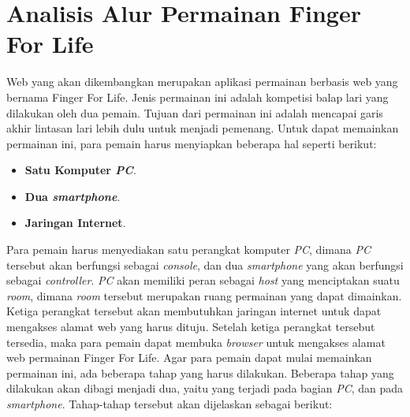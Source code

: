\section{Analisis Alur Permainan Finger For Life}
\label{alur}

Web yang akan dikembangkan merupakan aplikasi permainan berbasis web yang bernama Finger For Life. Jenis permainan ini adalah kompetisi balap lari yang dilakukan oleh dua pemain. Tujuan dari permainan ini adalah mencapai garis akhir lintasan lari lebih dulu untuk menjadi pemenang. Untuk dapat memainkan permainan ini, para pemain harus menyiapkan beberapa hal seperti berikut:

\begin{itemize}
	\item \textbf{Satu Komputer \textit{PC}}.
	\item \textbf{Dua \textit{smartphone}}.
	\item \textbf{Jaringan Internet}.
\end{itemize}

Para pemain harus menyediakan satu perangkat komputer \textit{PC}, dimana \textit{PC} tersebut akan berfungsi sebagai \textit{console}, dan dua \textit{smartphone} yang akan berfungsi sebagai \textit{controller}. \textit{PC} akan memiliki peran sebagai \textit{host} yang menciptakan suatu \textit{room}, dimana \textit{room} tersebut merupakan ruang permainan yang dapat dimainkan. Ketiga perangkat tersebut akan membutuhkan jaringan internet untuk dapat mengakses alamat web yang harus dituju. Setelah ketiga perangkat tersebut tersedia, maka para pemain dapat membuka \textit{browser} untuk mengakses alamat web permainan Finger For Life. Agar para pemain dapat mulai memainkan permainan ini, ada beberapa tahap yang harus dilakukan. Beberapa tahap yang dilakukan akan dibagi menjadi dua, yaitu yang terjadi pada bagian \textit{PC}, dan pada \textit{smartphone}. Tahap-tahap tersebut akan dijelaskan sebagai berikut:

